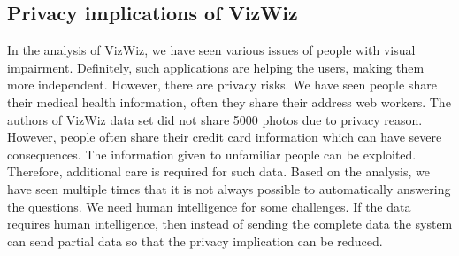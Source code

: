 \documentclass[sigconf]{acmart}
\begin{document}
\subsection{Privacy implications of VizWiz}
In the analysis of VizWiz, we have seen various issues of people with visual impairment. Definitely, such applications are helping the users, making them more independent. However, there are privacy risks. We have seen people share their medical health information, often they share their address web workers. The authors of VizWiz data set did not share 5000 photos due to privacy reason. However, people often share their credit card information which can have severe consequences. The information given to unfamiliar people can be exploited. Therefore, additional care is required for such data. Based on the analysis, we have seen multiple times that it is not always possible to automatically answering the questions. We need human intelligence for some challenges. If the data requires human intelligence, then instead of sending the complete data the system can send partial data so that the privacy implication can be reduced.
\end{document}

